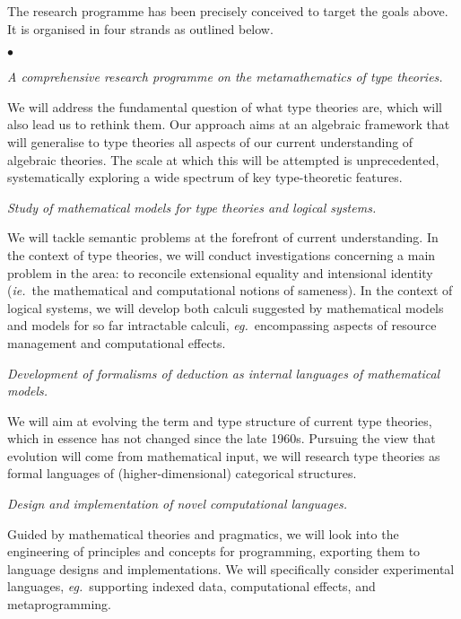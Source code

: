 \documentclass[11pt,twocolumn]{article}
\newenvironment{myitemize}
  {\begin{list}{$\bullet$}
  {\setlength{\topsep}{1pt}
   \setlength{\partopsep}{1pt}
   \setlength{\itemsep}{0pt}
   \setlength{\parsep}{0pt}
   \setlength{\leftmargin}{1em}
   \setlength{\labelwidth}{.5em}}}
  {\end{list}}
\newcommand{\eg}{\emph{eg.}}
\newcommand{\ie}{\emph{ie.}}
\begin{document}
The research programme has been precisely conceived to target the goals
above.  It is organised in four strands as outlined below.
\begin{myitemize}
\item[{\bfseries 1\enspace Foundations:}]\mbox{}\enspace\thinspace 
  \emph{A comprehensive research programme on the metamathematics of type
    theories.}

  \vspace*{1mm}
  We will address the fundamental question of what type theories are, which
  will also lead us to rethink them.  Our approach aims at an algebraic
  framework that will generalise to type theories all aspects of our current
  understanding of algebraic theories.  The scale at which this will be
  attempted is unprecedented, systematically exploring a wide spectrum of
  key type-theoretic features.
  \vspace*{1mm}

\item[{\bfseries 2\enspace Models:}]\mbox{}\enspace\thinspace
  \emph{Study of mathematical models for type theories and logical systems.}

  \vspace*{1mm}
  We will tackle semantic problems at the forefront of current understanding.
  In the context of type theories, we will conduct investigations
  concerning a main problem in the area: to reconcile extensional equality
  and intensional identity (\ie~the mathematical and computational notions
  of sameness).  
  In the context of logical systems, we will develop both calculi suggested by
  mathematical models and models for so far intractable calculi,
  \eg~encompassing aspects of resource management and computational effects.  
  \vspace*{1mm}%
  
\item[{\bfseries 3\enspace Calculi:}]\mbox{}\enspace\thinspace
  \emph{Development of formalisms of deduction as internal languages of
    mathematical models.}
  
  \vspace*{1mm}
  We will aim at evolving the term and type structure of current type
  theories, which in essence has not changed since the late 1960s.  Pursuing
  the view that evolution will come from mathematical input, we will
  research type theories as formal languages of (higher-dimensional)
  categorical structures.  
  \vspace*{1mm}

\item[{\bfseries 4\enspace Programming:}]\mbox{}\enspace\thinspace
  \emph{Design and implementation of novel computational languages.}

  \vspace*{1mm}
  Guided by mathematical theories and pragmatics, we will look into the
  engineering of principles and concepts for programming, exporting them to
  language designs and implementations.  We will specifically consider
  experimental languages, \eg~supporting indexed data,
  computational effects, and metaprogramming.  
\end{myitemize}
\end{document}
